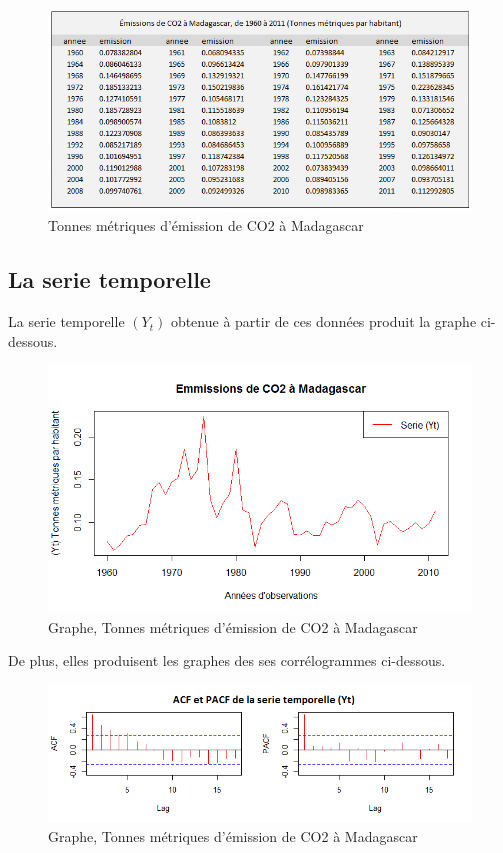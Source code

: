 \documentclass{article}
\begin{document}
\begin{figure}[h!]
\includegraphics[width=\linewidth]{images/data.png}
\caption{Tonnes métriques d'émission de CO2 à Madagascar}
\label{fig:data}
\end{figure}

\newpage

\subsection{La serie temporelle}
La serie temporelle $(Y_t)$ obtenue à partir de ces données produit la graphe ci-dessous.
\begin{figure}[h!]
\includegraphics[width=\linewidth]{images/Yt.png}
\caption{Graphe, Tonnes métriques d'émission de CO2 à Madagascar}
\label{fig:Yt}
\end{figure}

De plus, elles produisent les graphes des ses corrélogrammes ci-dessous.
\begin{figure}[h!]
\includegraphics[width=\linewidth]{images/Yt_acf_pacf.png}
\caption{Graphe, Tonnes métriques d'émission de CO2 à Madagascar}
\label{fig:Yt_acf_pacf}
\end{figure}
\end{document}
